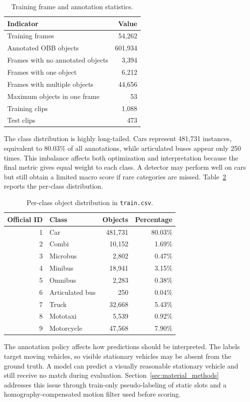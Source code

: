 \begin{table}[!t]
  \caption{Training frame and annotation statistics.}
  \label{tab:dataset_frame_summary}
  \centering
  \small
  \begin{tabular}{p{}r}
    \toprule
    \textbf{Indicator} & \textbf{Value} \\
    \midrule
    Training frames & 54,262 \\
    Annotated OBB objects & 601,934 \\
    Frames with no annotated objects & 3,394 \\
    Frames with one object & 6,212 \\
    Frames with multiple objects & 44,656 \\
    Maximum objects in one frame & 53 \\
    Training clips & 1,088 \\
    Test clips & 473 \\
    \bottomrule
  \end{tabular}
\end{table}

The class distribution is highly long-tailed. Cars represent 481,731 instances, equivalent to 80.03\% of all annotations, while articulated buses appear only 250 times. This imbalance affects both optimization and interpretation because the final metric gives equal weight to each class. A detector may perform well on cars but still obtain a limited macro score if rare categories are missed. Table~\ref{tab:dataset_class_distribution} reports the per-class distribution.

\begin{table}[!t]
  \caption{Per-class object distribution in \texttt{train.csv}.}
  \label{tab:dataset_class_distribution}
  \centering
  \small
  \begin{tabular}{rlrr}
    \toprule
    \textbf{Official ID} & \textbf{Class} & \textbf{Objects} & \textbf{Percentage} \\
    \midrule
    1 & Car & 481,731 & 80.03\% \\
    2 & Combi & 10,152 & 1.69\% \\
    3 & Microbus & 2,802 & 0.47\% \\
    4 & Minibus & 18,941 & 3.15\% \\
    5 & Omnibus & 2,283 & 0.38\% \\
    6 & Articulated bus & 250 & 0.04\% \\
    7 & Truck & 32,668 & 5.43\% \\
    8 & Mototaxi & 5,539 & 0.92\% \\
    9 & Motorcycle & 47,568 & 7.90\% \\
    \bottomrule
  \end{tabular}
\end{table}

The annotation policy affects how predictions should be interpreted. The labels target moving vehicles, so visible stationary vehicles may be absent from the ground truth. A model can predict a visually reasonable stationary vehicle and still receive no match during evaluation. Section~\ref{sec:material_methods} addresses this issue through train-only pseudo-labeling of static slots and a homography-compensated motion filter used before scoring.
